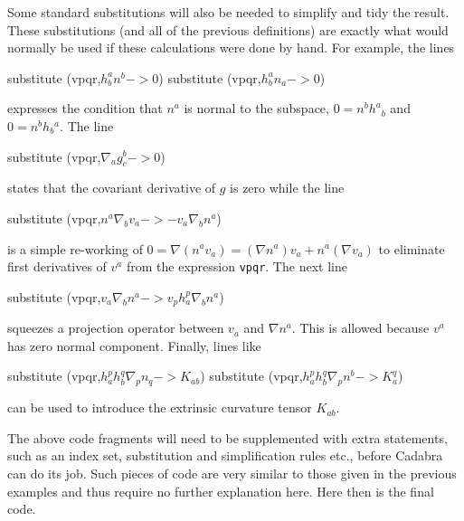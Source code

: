 \documentclass[a4paper,12pt]{article}
\numberwithin{equation}{section}%
\begin{document}
Some standard substitutions will also be needed to simplify and tidy the result. These
substitutions (and all of the previous definitions) are exactly what would normally be used
if these calculations were done by hand. For example, the lines
\begin{cadabra}[numbers=none]
   substitute (vpqr,$h^{a}_{b} n^{b} -> 0$)
   substitute (vpqr,$h^{a}_{b} n_{a} -> 0$)
\end{cadabra}
expresses the condition that $n^a$ is normal to the subspace, $0 = n^b h^{a}{}_{b}$ and
$0 = n^{b}h_{b}{}^{a}$. The line
\begin{cadabra}[numbers=none]
   substitute (vpqr,$\nabla_{a}{g^{b}_{c}} -> 0$)
\end{cadabra}
states that the covariant derivative of $g$ is zero while the line
\begin{cadabra}[numbers=none]
   substitute (vpqr,$n^{a} \nabla_{b}{v_{a}} -> -v_{a} \nabla_{b}{n^{a}}$)
\end{cadabra}
is a simple re-working of $0=\nabla\left(n^a v_a\right)=\left(\nabla n^a \right)v_a + n^a
\left(\nabla v_a\right)$ to eliminate first derivatives of $v^a$ from the expression
\verb|vpqr|. The next line
\begin{cadabra}[numbers=none]
   substitute (vpqr,$v_{a} \nabla_{b}{n^{a}} -> v_{p} h^{p}_{a} \nabla_{b}{n^{a}}$)
\end{cadabra}
squeezes a projection operator between $v_{a}$ and $\nabla n^a$. This is allowed because
$v^a$ has zero normal component. Finally, lines like
\begin{cadabra}[numbers=none]
   substitute (vpqr,$h^{p}_{a} h^{q}_{b} \nabla_{p}{n_{q}} -> K_{a b}$)
   substitute (vpqr,$h^{p}_{a} h^{q}_{b} \nabla_{p}{n^{b}} -> K_{a}^{q}$)
\end{cadabra}
can be used to introduce the extrinsic curvature tensor $K_{ab}$.

The above code fragments will need to be supplemented with extra statements, such as
an index set, substitution and simplification rules etc., before Cadabra can do its job.
Such pieces of code are very similar to those given in the previous examples and thus
require no further explanation here. Here then is the final code.
\end{document}
